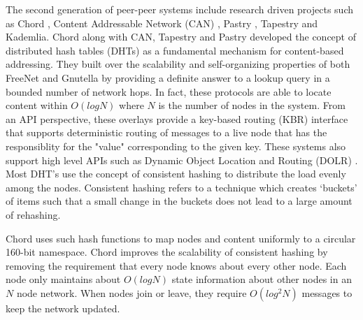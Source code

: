 The second generation of peer-peer systems include research driven projects such as Chord \cite{Stoica_2001}, Content
Addressable Network (CAN)
\cite{Ratnasamy_2001}, Pastry \cite{Rowstron_2001}, Tapestry \cite{tapestry2004} and
Kademlia. Chord along with CAN, Tapestry and Pastry developed the concept of distributed hash tables (DHTs) as a
fundamental mechanism for content-based addressing. They built over the scalability and self-organizing properties of
both FreeNet and Gnutella by providing a definite answer to a lookup query in a bounded number of network hops. In fact,
these protocols are able to locate content within \( O(log N) \) where \(N\) is the number of nodes in the system. From
an 
API perspective, these overlays provide a key-based routing (KBR) interface that supports deterministic routing of
messages to a live node that has the responsiblity for the "value" corresponding to the given key. These systems also
support high level APIs such as Dynamic Object Location and Routing (DOLR) \cite{dolr2003}. Most DHT's use the concept
of consistent hashing to distribute the load evenly among the nodes. Consistent hashing refers to a technique which
creates `buckets' of items such that a small change in the buckets does not lead to a large amount of rehashing.

% 
% 
Chord uses such hash functions to map nodes and content uniformly to a circular 160-bit
namespace. Chord improves the scalability of consistent hashing by removing the requirement that every node knows about
every other node. Each node only maintains about \(O (log N) \) state information about other nodes in an \( N \) node
network. When nodes join or leave, they require \( O(log^2 N) \) messages to keep the network updated.


